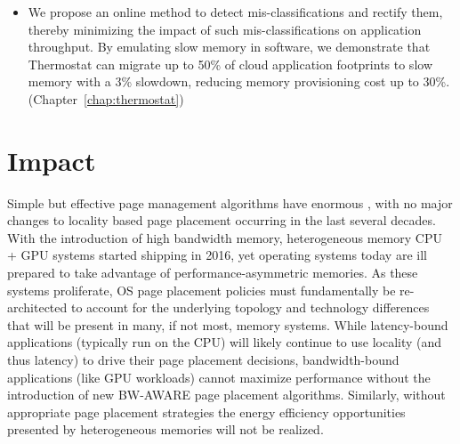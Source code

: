 \begin{itemize}
\item
We propose an online method to detect mis-classifications and rectify them,
thereby minimizing the impact of such mis-classifications on application
throughput.  By emulating slow memory in software, we demonstrate that
Thermostat can migrate up to 50\% of cloud application footprints to slow memory
with a 3\% slowdown, reducing memory provisioning cost up to 30\%.
(Chapter~\ref{chap:thermostat})
\end{itemize}

\section{Impact}
Simple but effective page management algorithms have enormous , with no
major changes to locality based page placement occurring in the last several
decades. With the introduction of high bandwidth memory, heterogeneous memory
CPU + GPU systems started shipping in 2016, yet operating systems today are ill
prepared to take advantage of performance-asymmetric memories. As these systems
proliferate, OS page placement policies must fundamentally be re-architected to
account for the underlying topology and technology differences that will be
present in many, if not most, memory systems. While latency-bound applications
(typically run on the CPU) will likely continue to use locality (and thus
latency) to drive their page placement decisions, bandwidth-bound applications
(like GPU workloads) cannot maximize performance without the introduction of new
BW-AWARE page placement algorithms. Similarly, without appropriate page
placement strategies the energy efficiency opportunities presented by
heterogeneous memories will not be realized.


